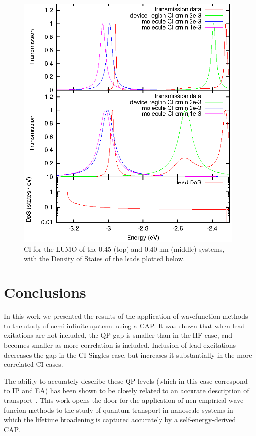 \begin{figure}
	\begin{center}
		\includegraphics[width=0.9\linewidth]{figures/cilumo.eps}
	\end{center}
	\caption{CI for the \ac{LUMO} of the 0.45 (top) and 0.40 nm (middle)
                 systems, with the Density of States of the leads plotted
                 below.}
	\label{fig:cilumo}
\end{figure}

\section{Conclusions}
\label{sec:conclusions}

In this work we presented the results of the application of wavefunction
methods to the study of semi-infinite systems using a \ac{CAP}. It was shown
that when lead exitations are not included, the QP gap is smaller than in the
HF case, and becomes smaller as more correlation is included. Inclusion of
lead excitations decreases the gap in the CI Singles case, but increases it
substantially in the more correlated CI cases.

The ability to accurately describe these QP levels (which in this case
correspond to \ac{IP} and \ac{EA}) has been shown to be closely related to an
accurate description of transport~\cite{golden}. This work opens the door for
the application of non-empirical wave funcion methods to the study of quantum
transport in nanoscale systems in which the lifetime broadening is captured
accurately by a self-energy-derived \ac{CAP}.
